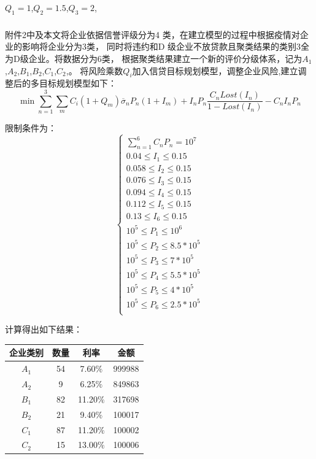 \documentclass[UTF8]{ctexart}
\begin{document}
$Q_1=1$,$Q_2=1.5$,$Q_3=2$,
	 
\subsubsection{}
附件2中及本文将企业依据信誉评级分为4 类，在建立模型的过程中根据疫情对企业的影响将企业分为3类，
同时将违约和D 级企业不放贷款且聚类结果的类别3全为D级企业。将数据分为6类，
根据聚类结果建立一个新的评价分级体系，记为$A_1$,$A_2$,$B_1$,$B_2$,$C_1$,$C_2$,。
将风险乘数$Q_i$加入信贷目标规划模型，调整企业风险,建立调整后的多目标规划模型如下：
\begin{equation}
	\min \sum_{n = 1}^{3}\sum_{m}C_i(1+Q_m)\overline{\sigma }_n P_n (1+I_m)+I_n P_n \frac{C_n Lost(I_n)}{1-Lost(I_n)}-C_n I_n P_n   
\end{equation}

限制条件为：
\[\left\{\begin{array}{lllll}
	\sum_{n = 1}^{6}C_n  P_n = 10^7 \\
	0.04 \le I_1 \le 0.15\\
	0.058 \le I_2 \le 0.15\\
	0.076 \le I_3 \le 0.15\\
	0.094 \le I_4 \le 0.15\\
	0.112 \le I_5 \le 0.15\\
	0.13 \le I_6 \le 0.15\\
	10^5 \le P_1 \le 10^6\\
	10^5 \le P_2 \le 8.5*10^5\\
	10^5 \le P_3 \le 7*10^5\\
	10^5 \le P_4 \le 5.5*10^5\\
	10^5 \le P_5 \le 4*10^5\\
	10^5 \le P_6 \le 2.5*10^5\\

	\end{array}\right. \]

计算得出如下结果：

\begin{center}
	\centering
	\begin{tabular}{||c c c c ||}
		
		\hline
		企业类别 & 数量 & 利率 & 金额        \\ [0.5ex]
		\hline
		$A_1$   & 54     & 7.60$\%$ & 999988  \\
		\hline
		$A_2$   & 9     & 6.25$\%$ & 849863  \\
		\hline
		$B_1$   & 82     & 11.20$\%$ & 317698  \\
		\hline
		$B_2$   & 21     & 9.40$\%$ & 100017  \\
		\hline
		$C_1$   & 87     & 11.20$\%$ & 100002  \\
		\hline
		$C_2$   & 15     & 13.00$\%$ & 100006  \\
		\hline
	\end{tabular}
\end{center}
\end{document}
